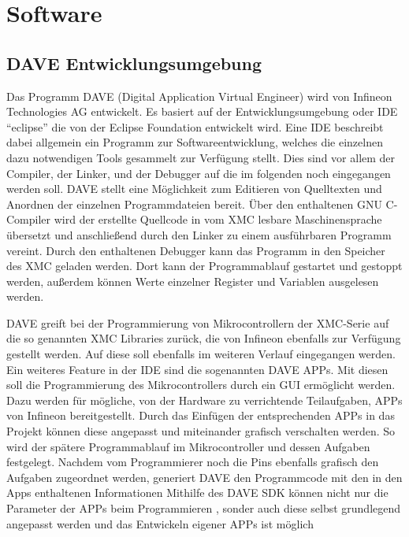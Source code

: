 \chapter{Software}
\label{sec:Software}
\pagestyle{scrheadings}
\section{DAVE Entwicklungsumgebung}

Das Programm DAVE (Digital Application Virtual Engineer) wird von Infineon Technologies AG entwickelt. Es basiert auf der Entwicklungsumgebung oder \ac{IDE} \enquote{eclipse} die von der Eclipse Foundation entwickelt wird. Eine \ac{IDE} beschreibt dabei allgemein ein Programm zur Softwareentwicklung, welches die einzelnen dazu notwendigen Tools gesammelt zur Verfügung stellt. Dies sind vor allem der Compiler, der Linker, und der Debugger auf die im folgenden noch eingegangen werden soll. DAVE stellt eine Möglichkeit zum Editieren von Quelltexten und Anordnen der einzelnen Programmdateien bereit. Über den enthaltenen GNU C-Compiler wird der erstellte Quellcode in vom XMC lesbare Maschinensprache übersetzt und anschließend durch den Linker zu einem ausführbaren Programm vereint. Durch den enthaltenen Debugger kann das Programm in den Speicher des XMC geladen werden. Dort kann der Programmablauf gestartet und gestoppt werden, außerdem können Werte einzelner Register und Variablen ausgelesen werden. 

DAVE greift bei der Programmierung von Mikrocontrollern der XMC-Serie auf die so genannten XMC Libraries zurück, die von Infineon ebenfalls zur Verfügung gestellt werden.  Auf diese soll ebenfalls im weiteren Verlauf  eingegangen werden. Ein weiteres Feature in der \ac{IDE} sind die sogenannten DAVE APPs. Mit diesen soll die Programmierung des Mikrocontrollers durch ein \ac{GUI} ermöglicht werden. Dazu werden für  mögliche, von der Hardware zu verrichtende Teilaufgaben, APPs von Infineon bereitgestellt. Durch das Einfügen der entsprechenden APPs in das Projekt können diese angepasst und miteinander grafisch verschalten werden. So wird der spätere Programmablauf im Mikrocontroller und dessen Aufgaben festgelegt. Nachdem vom Programmierer noch die Pins ebenfalls grafisch den Aufgaben zugeordnet werden, generiert  DAVE  den Programmcode mit den in den Apps enthaltenen Informationen%
Mithilfe des DAVE \ac{SDK} können nicht nur die Parameter der APPs beim Programmieren , sonder auch diese selbst grundlegend angepasst werden und das Entwickeln eigener APPs ist möglich%

